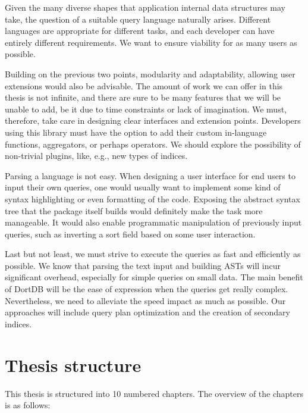 Given the many diverse shapes that application internal data structures may take, the question of a suitable query language naturally arises. Different languages are appropriate for different tasks, and each developer can have entirely different requirements. We want to ensure viability for as many users as possible.

Building on the previous two points, modularity and adaptability, allowing user extensions would also be advisable. The amount of work we can offer in this thesis is not infinite, and there are sure to be many features that we will be unable to add, be it due to time constraints or lack of imagination. We must, therefore, take care in designing clear interfaces and extension points. Developers using this library must have the option to add their custom in-language functions, aggregators, or perhaps operators. We should explore the possibility of non-trivial plugins, like, e.g., new types of indices.

Parsing a language is not easy. When designing a user interface for end users to input their own queries, one would usually want to implement some kind of syntax highlighting or even formatting of the code. Exposing the abstract syntax tree that the package itself builds would definitely make the task more manageable. It would also enable programmatic manipulation of previously input queries, such as inverting a sort field based on some user interaction.

Last but not least, we must strive to execute the queries as fast and efficiently as possible. We know that parsing the text input and building ASTs will incur significant overhead, especially for simple queries on small data. The main benefit of DortDB will be the ease of expression when the queries get really complex. Nevertheless, we need to alleviate the speed impact as much as possible. Our approaches will include query plan optimization and the creation of secondary indices.

\section*{Thesis structure}

This thesis is structured into 10 numbered chapters. The overview of the chapters is as follows:

